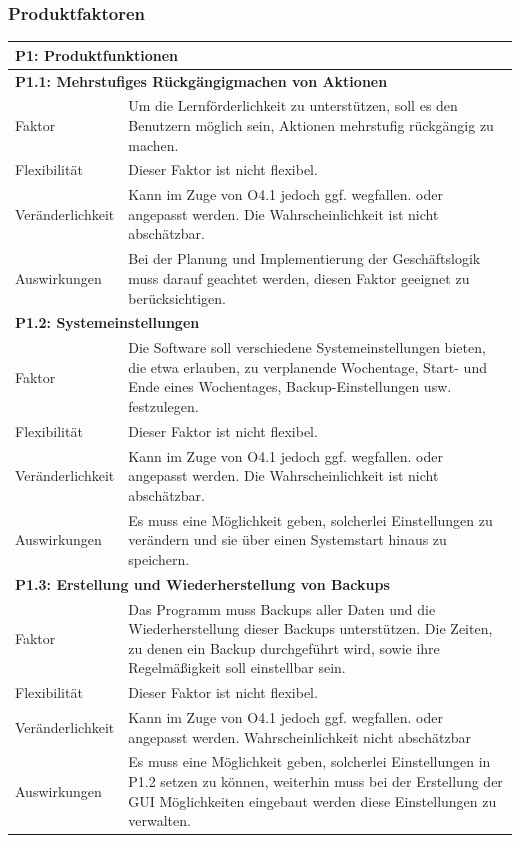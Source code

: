 \documentclass[fontsize=12pt,paper=a4,twoside]{scrartcl}
\begin{document}
\newpage

\subsubsection{Produktfaktoren}
\begin{tabularx}{\textwidth}{|l|X|}
\hline
\multicolumn{2}{|l|}{\textbf{P1: Produktfunktionen}}\\\hline
\multicolumn{2}{|l|}{\textbf{P1.1: Mehrstufiges Rückgängigmachen von Aktionen}}\\\hline
Faktor & Um die Lernförderlichkeit zu unterstützen, soll es den Benutzern möglich sein, Aktionen mehrstufig rückgängig zu machen. \\\hline
Flexibilität & Dieser Faktor ist nicht flexibel. \\\hline
Veränderlichkeit & Kann im Zuge von O4.1 jedoch ggf. wegfallen. oder angepasst werden.  Die Wahrscheinlichkeit ist nicht abschätzbar. \\\hline
Auswirkungen & Bei der Planung und Implementierung der Geschäftslogik muss darauf geachtet werden, diesen Faktor geeignet zu berücksichtigen. \\\hline
\multicolumn{2}{|l|}{\textbf{P1.2: Systemeinstellungen}}\\\hline
Faktor & Die Software soll verschiedene Systemeinstellungen bieten, die etwa erlauben, zu verplanende Wochentage, Start- und Ende eines Wochentages, Backup-Einstellungen usw. festzulegen.  \\\hline
Flexibilität & Dieser Faktor ist nicht flexibel. \\\hline
Veränderlichkeit & Kann im Zuge von O4.1 jedoch ggf. wegfallen. oder angepasst werden.  Die Wahrscheinlichkeit ist nicht abschätzbar. \\\hline
Auswirkungen & Es muss eine Möglichkeit geben, solcherlei Einstellungen zu verändern und sie über einen Systemstart hinaus zu speichern. \\\hline
\multicolumn{2}{|l|}{\textbf{P1.3: Erstellung und Wiederherstellung von Backups}}\\\hline
Faktor & Das Programm muss Backups aller Daten und die Wiederherstellung dieser Backups unterstützen. Die Zeiten, zu denen ein Backup durchgeführt wird, sowie ihre Regelmäßigkeit soll einstellbar sein. \\\hline
Flexibilität & Dieser Faktor ist nicht flexibel. \\\hline
Veränderlichkeit & Kann im Zuge von O4.1 jedoch ggf. wegfallen. oder angepasst werden.  Wahrscheinlichkeit nicht abschätzbar \\\hline
Auswirkungen &  Es muss eine Möglichkeit geben, solcherlei Einstellungen in P1.2 setzen zu können, weiterhin muss bei der Erstellung der GUI Möglichkeiten eingebaut werden diese Einstellungen zu verwalten. \\\hline
\end{tabularx} \newpage
\end{document}
